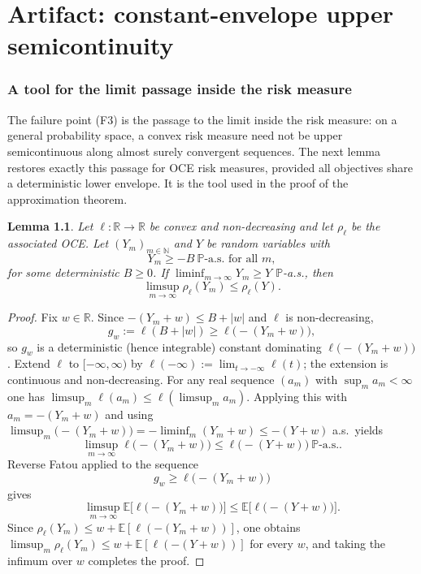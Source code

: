 \documentclass[11pt,a4paper]{report}
\numberwithin{equation}{chapter}
\theoremstyle{plain}
\newtheorem{lemma}[proposition]{Lemma}
\theoremstyle{definition}
\newcommand{\E}{\mathbb{E}}
\newcommand{\PP}{\mathbb{P}}
\newcommand{\R}{\mathbb{R}}
\newcommand{\N}{\mathbb{N}}
\newcommand{\as}{\ \PP\text{-a.s.}}
\begin{document}
\setcounter{chapter}{3}

\chapter{Artifact: constant-envelope upper semicontinuity}

\subsection*{A tool for the limit passage inside the risk measure}

The failure point (F3) is the passage to the limit inside the risk
measure: on a general probability space, a convex risk measure need not
be upper semicontinuous along almost surely convergent sequences. The
next lemma restores exactly this passage for OCE risk measures, provided
all objectives share a deterministic lower envelope. It is the tool used
in the proof of the approximation theorem.

\begin{lemma}\label{lem:usc}
  Let $\ell:\R\to\R$ be convex and non-decreasing and let $\rho_\ell$ be
  the associated OCE. Let $(Y_m)_{m\in\N}$ and $Y$ be random variables
  with
  \[
    Y_m\ge-B\as\text{ for all }m,
  \]
  for some deterministic $B\ge0$. If $\liminf_{m\to\infty}Y_m\ge Y$
  $\PP$-a.s., then
  \[
    \limsup_{m\to\infty}\rho_\ell(Y_m)\le\rho_\ell(Y).
  \]
\end{lemma}

\begin{proof}
  Fix $w\in\R$. Since $-(Y_m+w)\le B+|w|$ and $\ell$ is non-decreasing,
  \[
    g_w:=\ell(B+|w|)\ge\ell\bigl(-(Y_m+w)\bigr),
  \]
  so $g_w$ is a deterministic (hence integrable) constant dominating
  $\ell\bigl(-(Y_m+w)\bigr)$. Extend $\ell$ to
  $[-\infty,\infty)$ by $\ell(-\infty):=\lim_{t\to-\infty}\ell(t)$; the
  extension is continuous and non-decreasing. For any real sequence
  $(a_m)$ with $\sup_m a_m<\infty$ one has
  $\limsup_m\ell(a_m)\le\ell(\limsup_m a_m)$. Applying this with
  $a_m=-(Y_m+w)$ and using
  $\limsup_m\bigl(-(Y_m+w)\bigr)=-\liminf_m(Y_m+w)\le-(Y+w)$ a.s.\ yields
  \[
    \limsup_{m\to\infty}\ell\bigl(-(Y_m+w)\bigr)\le\ell\bigl(-(Y+w)\bigr)\as.
  \]
  Reverse Fatou applied to the sequence
  \[
    g_w\ge\ell\bigl(-(Y_m+w)\bigr)
  \]
  gives
  \[
    \limsup_{m\to\infty}\E\bigl[\ell\bigl(-(Y_m+w)\bigr)\bigr]
    \le\E\bigl[\ell\bigl(-(Y+w)\bigr)\bigr].
  \]
  Since $\rho_\ell(Y_m)\le w+\E[\ell(-(Y_m+w))]$, one obtains
  $\limsup_m\rho_\ell(Y_m)\le w+\E[\ell(-(Y+w))]$ for every $w$, and
  taking the infimum over $w$ completes the proof.
\end{proof}
\end{document}
